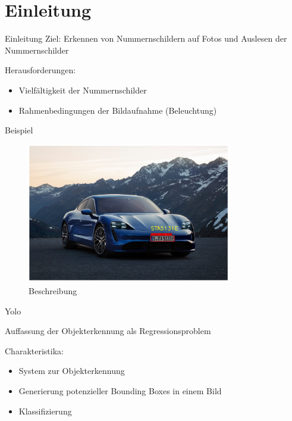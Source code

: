 \section{Einleitung}

\begin{frame}{Einleitung}
    Ziel: Erkennen von Nummernschildern auf Fotos und Auslesen der Nummernschilder
    
    Herausforderungen:
    \begin{itemize}
        \item Vielfältigkeit der Nummernschilder
        \item Rahmenbedingungen der Bildaufnahme (Beleuchtung)
    \end{itemize}
\end{frame}

\begin{frame}{Beispiel}
  \begin{figure}
    \begin{center}
      \includegraphics[width=0.8\textwidth]{bilder/Bild2}
      \caption{Beschreibung}
    \end{center}
  \end{figure}
  \end{frame}

\begin{frame}{Yolo}
    
    Auffassung der Objekterkennung als Regressionsproblem 
    
    Charakteristika:
    \begin{itemize}
        \item System zur Objekterkennung 
        \item Generierung potenzieller Bounding Boxes in einem Bild
        \item Klassifizierung
    \end{itemize}
\end{frame}